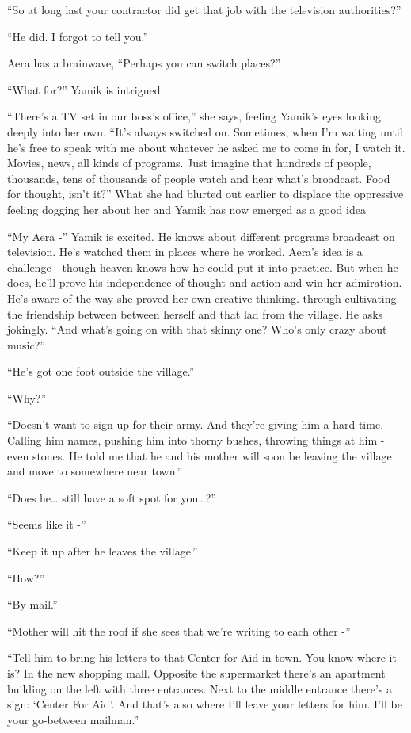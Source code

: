 \documentclass[twoside,11pt]{book}
\begin{document}
``So at long last your contractor did get that job with the television authorities?''

``He did. I forgot to tell you.''

Aera has a brainwave, ``Perhaps you can switch places?''

``What for?'' Yamik is intrigued.

``There's a TV set in our boss's office,'' she says, feeling Yamik's eyes looking deeply into
her own. ``It's always switched on. Sometimes, when I'm waiting until he's free to speak with me about
whatever he asked me to come in for, I watch it. Movies, news, all kinds of programs. Just imagine that hundreds of
people, thousands, tens of thousands of people watch and hear what's broadcast. Food for thought, isn't
it?'' What she had blurted out earlier to displace the oppressive feeling dogging her about her and Yamik
has now emerged as a good idea

``My Aera -'' Yamik is excited. He knows about different programs broadcast on television.
He's watched them in places where he worked. Aera's idea is a challenge -\newline
though heaven knows how he could put it into practice. But when he does, he'll prove his independence of thought and
action and win her admiration. He's aware of the way she proved her own creative thinking. through
cultivating the friendship between between herself and that lad from the village. He asks jokingly. ``And
what's going on with that skinny one? Who's only crazy about music?''

``He's got one foot outside the village.''

``Why?''

``Doesn't want to sign up for their army. And they're giving him a hard time. Calling him names, pushing
him into thorny bushes, throwing things at him - even stones.  He told me that he and his mother will soon be leaving
the village and move to somewhere near town.''

``Does he{\dots} still have a soft spot for you{\dots}?''

``Seems like it -''

``Keep it up after he leaves the village.''

``How?''

``By mail.''

``Mother will hit the roof if she sees that we're writing to each other -''

``Tell him to bring his letters to that Center for Aid in town. You know where it is? In the new shopping
mall. Opposite the supermarket there's an apartment building on the left with three entrances. Next to the middle
entrance there's a sign: `Center For Aid'. And that's also where I'll leave your letters for him. I'll be your
go-between mailman.''
\end{document}
